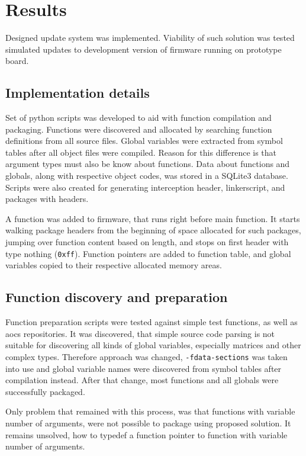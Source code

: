 \newpage
\section{Results}

Designed update system was implemented. Viability of such solution was tested simulated updates to development version of firmware running on prototype board.

\subsection{Implementation details}

Set of python scripts was developed to aid with function compilation and packaging. Functions were discovered and allocated by searching function definitions from all source files. Global variables were extracted from symbol tables after all object files were compiled. Reason for this difference is that argument types must also be know about functions. Data about functions and globals, along with respective object codes, was stored in a SQLite3 database. Scripts were also created for generating interception header, linkerscript, and packages with headers.

A function was added to firmware, that runs right before main function. It starts walking package headers from the beginning of space allocated for such packages, jumping over function content based on length, and stops on first header with type nothing (\texttt{0xff}). Function pointers are added to function table, and global variables copied to their respective allocated memory areas.

\subsection{Function discovery and preparation}

Function preparation scripts were tested against simple test functions, as well as \gls{aocs} repositories. It was discovered, that simple source code parsing is not suitable for discovering all kinds of global variables, especially matrices and other complex types. Therefore approach was changed, \texttt{-fdata-sections} was taken into use and global variable names were discovered from symbol tables after compilation instead. After that change, most functions and all globals were successfully packaged.

Only problem that remained with this process, was that functions with variable number of arguments, were not possible to package using proposed solution. It remains unsolved, how to typedef a function pointer to function with variable number of arguments.

